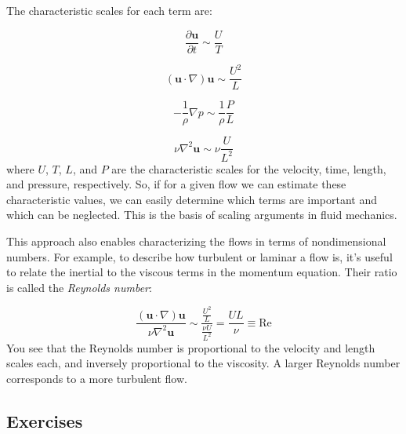 \documentclass[12pt]{article}
\numberwithin{equation}{section}
\numberwithin{figure}{section}
\numberwithin{table}{section}
\begin{document}
The characteristic scales for each term are:

\begin{equation}
  \frac{\partial \mathbf{u}}{\partial t} \sim \frac{U}{T}
\end{equation}

\begin{equation}
  (\mathbf{u} \cdot \nabla) \mathbf{u} \sim \frac{U^2}{L}
\end{equation}

\begin{equation}
  - \frac{1}{\rho} \nabla p \sim \frac{1}{\rho} \frac{P}{L}
\end{equation}

\begin{equation}
  \nu \nabla^2 \mathbf{u} \sim \nu \frac{U}{L^2}
\end{equation}
where $U$, $T$, $L$, and $P$ are the characteristic scales for the velocity,
time, length, and pressure, respectively.
So, if for a given flow we can estimate these characteristic values, we can
easily determine which terms are important and which can be neglected.
This is the basis of scaling arguments in fluid mechanics.

This approach also enables characterizing the flows in terms of
nondimensional numbers.
For example, to describe how turbulent or laminar a flow is, it's useful to
relate the inertial to the viscous terms in the momentum equation.
Their ratio is called the  \textit{Reynolds number}:

\begin{equation}
  \frac{(\mathbf{u} \cdot \nabla) \mathbf{u}}{\nu \nabla^2 \mathbf{u}} \sim
  \frac{\frac{U^2}{L}}{\frac{\nu U}{L^2}} = \frac{UL}{\nu} \equiv \text{Re}
  \label{eq:reynolds_number}
\end{equation}
You see that the Reynolds number is proportional to the velocity and length
scales each, and inversely proportional to the viscosity.
A larger Reynolds number corresponds to a more turbulent flow.

\subsection{Exercises}
\end{document}

